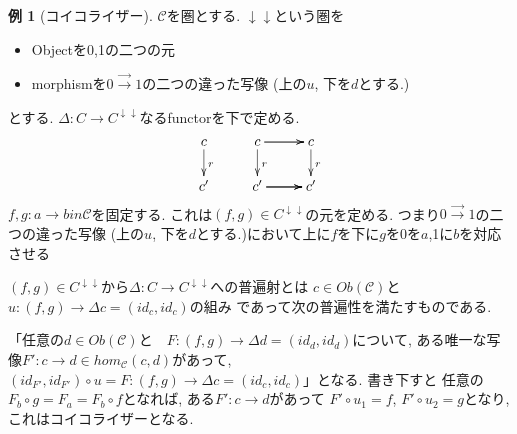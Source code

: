 \documentclass[dvipdfmx,a4paper,11pt]{article}
\theoremstyle{definition}
\newtheorem{exa}[thm]{例}
\begin{document}
\begin{exa}[コイコライザー]
$\mathcal{C} $を圏とする. 
$\downarrow \downarrow$という圏を
\begin{itemize}
\item Objectを0,1の二つの元
\item morphismを$0 \overset{\to}{\to} 1$の二つの違った写像 (上の$u$, 下を$d$とする.)
\end{itemize}
とする.
$\Delta: C \to C^{\downarrow \downarrow}$なるfunctorを下で定める. 
\begin{equation*}
\xymatrix@C=25pt@R=20pt{
c\ar@{->}[d]^{r}&
c \ar@{->}[d]^{r}\ar@{->}[r]\ar@{->}[r]  &
 c \ar@{->}[d]^{r}\\
 c' &
c' \ar@{->}[r] \ar@{->}[r] \ar@{->}[r]& 
c'\\   
}
\end{equation*}
$f,g : a \to b in \mathcal{C}$を固定する.
これは$(f,g) \in C^{\downarrow \downarrow}$の元を定める.
つまり$0 \overset{\to}{\to} 1$の二つの違った写像 (上の$u$, 下を$d$とする.)において上に$f$を下に$g$を0を$a$,1に$b$を対応させる

$(f,g) \in C^{\downarrow \downarrow}$から$\Delta: C \to C^{\downarrow \downarrow}$への普遍射とは
$c \in Ob(\mathcal{C})$と
$u: (f,g)\to \Delta c =(id_c,id_c)$の組み
であって次の普遍性を満たすものである.

「任意の$d \in Ob(\mathcal{C})$と　$F : (f,g)\to \Delta d =(id_d,id_d)$について, ある唯一な写像$F' : c \to d \in hom_{\mathcal{C}}(c,d)$があって, $(id_{F'}, id_{F'}) \circ u = F : (f,g)\to \Delta c =(id_c,id_c)$」となる.
書き下すと
任意の$F_{b} \circ g = F_{a} = F_b \circ f$となれば, ある$F': c \to d$があって
$F ' \circ u_1  = f$, $F' \circ u_2 = g$となり, これはコイコライザーとなる. 
\end{exa}
\end{document}
